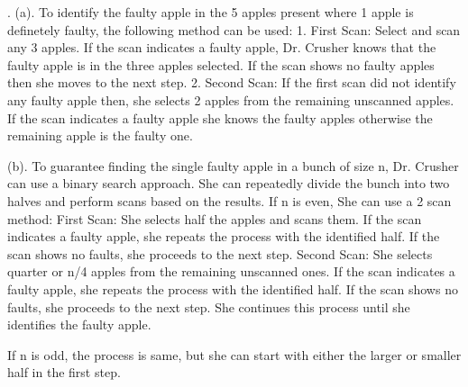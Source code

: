 \documentclass[a4paper]{exam}
\begin{document}
\begin{questions}
\begin{solution}
\text{}. 
(a). To identify the faulty apple in the 5 apples present where 1 apple is definetely faulty, the following method can be used: 
1. First Scan: Select and scan any 3 apples. If the scan indicates a faulty apple, Dr. Crusher knows that the faulty apple is in the three apples selected. If the scan shows no faulty apples then she moves to the next step. 
2. Second Scan: If the first scan did not identify any faulty apple then, she selects 2 apples from the remaining unscanned apples. If the scan indicates a faulty apple she knows the faulty apples otherwise the remaining apple is the faulty one. 

(b). To guarantee finding the single faulty apple in a bunch of size n, Dr. Crusher can use a binary search approach. She can repeatedly divide the bunch into two halves and perform scans based on the results.
If n is even, She can use a 2 scan method: 
First Scan: She selects half the apples and scans them. If the scan indicates a faulty apple, she repeats the process with the identified half. If the scan shows no faults, she proceeds to the next step.
Second Scan: She selects quarter or n/4 apples from the remaining unscanned ones. If the scan indicates a faulty apple, she repeats the process with the identified half. If the scan shows no faults, she proceeds to the next step. She continues this process until she identifies the faulty apple.

If n is odd, the process is same, but she can start with either the larger or smaller half in the first step.

\end{solution}

\end{questions}
\end{document}
